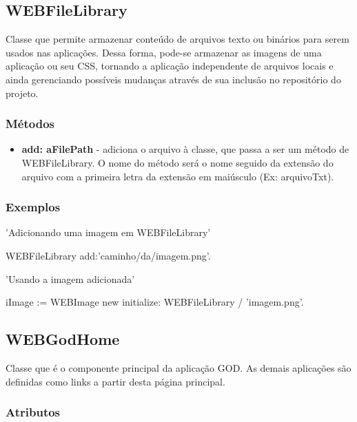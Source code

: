 \subsection{WEBFileLibrary} 

Classe que permite armazenar conteúdo de arquivos texto ou binários para serem usados nas aplicações. Dessa forma, pode-se armazenar as imagens de uma aplicação ou seu CSS, tornando a aplicação independente de arquivos locais e ainda gerenciando possíveis mudanças através de sua inclusão no repositório do projeto.


\subsubsection{Métodos}

\begin{itemize}
 \item \textbf{add: aFilePath} - adiciona o arquivo à classe, que passa a ser um método de WEBFileLibrary. O nome do método será o nome seguido da extensão do arquivo com a primeira letra da extensão em maiúsculo (Ex: arquivoTxt).
\end{itemize}

\subsubsection{Exemplos}

\begin{godCode}
'Adicionando uma imagem em WEBFileLibrary'

WEBFileLibrary add:'caminho/da/imagem.png'.

'Usando a imagem adicionada'

iImage := WEBImage new initialize: WEBFileLibrary / 'imagem.png'.

\end{godCode}



\subsection{WEBGodHome} 

Classe que é o componente principal da aplicação GOD. As demais aplicações são definidas como links a partir desta página principal.

\subsubsection{Atributos}

